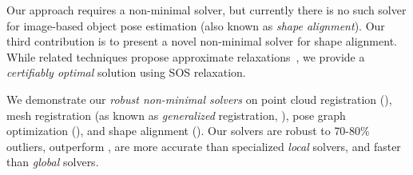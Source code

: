 Our approach requires 
a non-minimal solver, but currently there is no such solver for 
image-based object pose estimation (also known as \emph{shape alignment}).
Our third contribution is to present a novel non-minimal solver for shape alignment.
While related techniques propose approximate relaxations~\cite{Zhou17pami-shapeEstimationConvex}, we 
provide a 
\emph{certifiably optimal} solution 
using SOS relaxation. 

We demonstrate our \emph{robust non-minimal solvers} on point cloud registration (\PCR), mesh registration (as known as \emph{generalized} registration, \GReg), pose graph optimization (\PGO), and shape alignment (\shape).
Our solvers  are robust to {70-80\%} outliers, 
outperform \ransac, 
are more accurate than specialized \emph{local} solvers, and 
faster than \emph{global} solvers.

